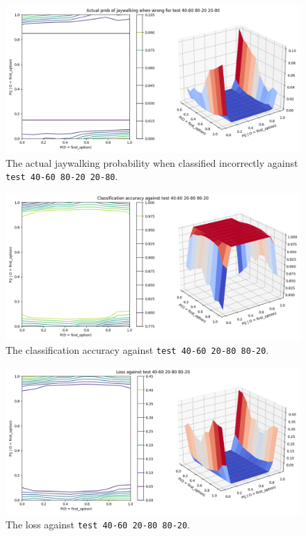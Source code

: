 \documentclass{report}
\newcommand{\code}{\texttt}
\begin{document}
\begin{figure}[h]
    \centering
    \includegraphics[width=\textwidth]{test_40-60_80-20_20-80_jay_prob.png}
    \caption[]{The actual jaywalking probability when classified incorrectly against \code{test 40-60 80-20 20-80}.}
    \label{fig:test_40-60_80-20_20-80_jay_prob_plot}
\end{figure}

% 
% 

\begin{figure}[h]
    \centering
    \includegraphics[width=\textwidth]{test_40-60_20-80_80-20_accuracy.png}
    \caption[]{The classification accuracy against \code{test 40-60 20-80 80-20}.}
    \label{fig:test_40-60_20-80_80-20_accuracy_plot}
\end{figure}

\begin{figure}[h]
    \centering
    \includegraphics[width=\textwidth]{test_40-60_20-80_80-20_loss.png}
    \caption[]{The loss against \code{test 40-60 20-80 80-20}.}
    \label{fig:test_40-60_20-80_80-20_loss_plot}
\end{figure}
\end{document}
